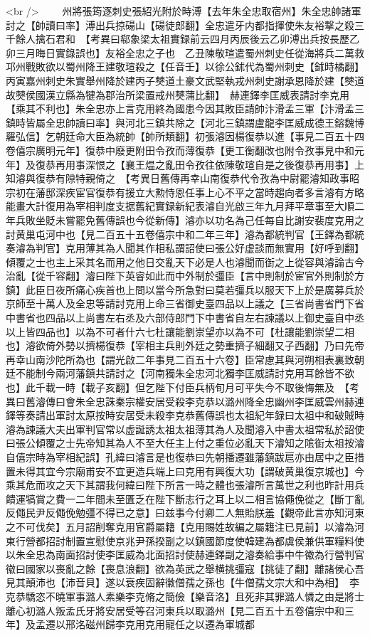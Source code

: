 <br />
　　州將張筠逐刺史張紹光附於時溥【去年朱全忠取宿州】朱全忠帥諸軍討之【帥讀曰率】溥出兵掠碭山【碭徒郎翻】全忠遣牙内都指揮使朱友裕撃之殺三千餘人擒石君和　【考異曰郗象梁太祖實録前云四月丙辰後云乙卯溥出兵按長歷乙卯三月晦日實錄誤也】友裕全忠之子也　乙丑陳敬瑄遣蜀州刺史任從海將兵二萬救邛州戰敗欲以蜀州降王建敬瑄殺之【任音壬】以徐公鉥代為蜀州刺史【鉥時橘翻】丙寅嘉州刺史朱實舉州降於建丙子僰道土豪文武堅執戎州刺史謝承恩降於建【僰道故僰侯國漢立縣為犍為郡治所梁置戒州僰蒲比翻】　赫連鐸李匡威表請討李克用【乘其不利也】朱全忠亦上言克用終為國患今因其敗臣請帥汴滑孟三軍【汴滑孟三鎮時皆屬全忠帥讀曰率】與河北三鎮共除之【河北三鎮謂盧龍李匡威成德王鎔魏博羅弘信】乞朝廷命大臣為統帥【帥所類翻】初張濬因楊復恭以進【事見二百五十四卷僖宗廣明元年】復恭中廢更附田令孜而薄復恭【更工衡翻改也附令孜事見中和元年】及復恭再用事深恨之【襄王煴之亂田令孜往依陳敬瑄自是之後復恭再用事】上知濬與復恭有隙特親倚之　【考異日舊傳再幸山南復恭代令孜為中尉罷濬知政事昭宗初在藩邸深疾宦官復恭有援立大勲恃恩任事上心不平之當時趨向者多言濬有方略能畫大計復用為宰相判度支据舊紀實録新紀表濬自光啟三年九月拜平章事至大順二年兵敗坐貶未嘗罷免舊傳誤也今從新傳】濬亦以功名為己任每自比謝安裴度克用之討黄巢屯河中也【見二百五十五卷僖宗中和二年三年】濬為都統判官【王鐸為都統奏濬為判官】克用薄其為人聞其作相私謂詔使曰張公好虚談而無實用【好呼到翻】傾覆之士也主上采其名而用之他日交亂天下必是人也濬聞而衘之上從容與濬論古今治亂【從千容翻】濬曰陛下英睿如此而中外制於彊臣【言中則制於宦官外則制於方鎮】此臣日夜所痛心疾首也上問以當今所急對曰莫若彊兵以服天下上於是廣募兵於京師至十萬人及全忠等請討克用上命三省御史臺四品以上議之【三省尚書省門下省中書省也四品以上尚書左右丞及六部侍郎門下中書省自左右諫議以上御史臺自中丞以上皆四品也】以為不可者什六七杜讓能劉崇望亦以為不可【杜讓能劉崇望二相也】濬欲倚外勢以擠楊復恭【宰相主兵則外廷之勢重擠子細翻又子西翻】乃曰先帝再幸山南沙陀所為也【謂光啟二年事見二百五十六卷】臣常慮其與河朔相表裏致朝廷不能制今兩河藩鎮共請討之【河南獨朱全忠河北獨李匡威請討克用耳餘皆不欲也】此千載一時【載子亥翻】但乞陛下付臣兵柄旬月可平失今不取後悔無及　【考異曰舊濬傳曰會朱全忠誅秦宗權安居受殺李克恭以潞州降全忠幽州李匡威雲州赫連鐸等奏請出軍討太原按時安居受未殺李克恭舊傳誤也太祖紀年録曰太祖中和破賊時濬為諫議大夫出軍判官常以虚誕誘太祖太祖薄其為人及聞濬入中書太祖常私於詔使曰張公傾覆之士先帝知其為人不至大任主上付之重位必亂天下濬知之隂衘太祖按濬自僖宗時為宰相紀誤】孔緯曰濬言是也復恭曰先朝播遷雖藩鎮跋扈亦由居中之臣措置未得其宜今宗廟甫安不宜更造兵端上曰克用有興復大功【謂破黄巢復京城也】今乘其危而攻之天下其謂我何緯曰陛下所言一時之體也張濬所言萬世之利也昨計用兵饋運犒賞之費一二年間未至匱乏在陛下斷志行之耳上以二相言協僶俛從之【斷丁亂反僶民尹反僶俛勉彊不得已之意】曰兹事今付卿二人無貽朕羞【觀帝此言亦知河東之不可伐矣】五月詔削奪克用官爵屬籍【克用賜姓故編之屬籍注已見前】以濬為河東行營都招討制置宣慰使京兆尹孫揆副之以鎮國節度使韓建為都虞侯兼供軍糧料使以朱全忠為南面招討使李匡威為北面招討使赫連鐸副之濬奏給事中牛徽為行營判官徽曰國家以喪亂之餘【喪息浪翻】欲為英武之舉横挑彊寇【挑徒了翻】離諸侯心吾見其顛沛也【沛音貝】遂以衰疾固辭徽僧孺之孫也【牛僧孺文宗大和中為相】　李克恭驕恣不曉軍事潞人素樂李克脩之簡儉【樂音洛】且死非其罪潞人憐之由是將士離心初潞人叛孟氏牙將安居受等召河東兵以取潞州【見二百五十五卷僖宗中和三年】及孟遷以邢洺磁州歸李克用克用寵任之以遷為軍城都